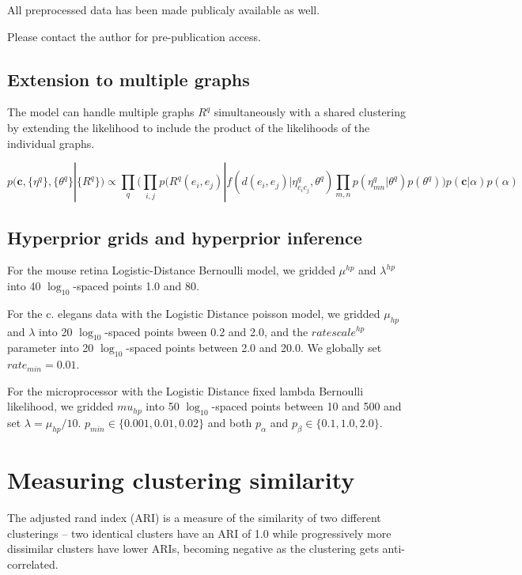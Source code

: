 \documentclass{article}
\renewcommand{\vec}[1]{\mathbf{#1}}
\begin{document}
All preprocessed data has been made publicaly available as well. 

Please contact the author for pre-publication access. 

\subsection{Extension to multiple graphs}
\label{supp:multigraph}
The model can handle multiple graphs $R^q$ simultaneously with a shared clustering by extending the likelihood to include the product of the likelihoods of the individual graphs. 

\begin{equation}
  p(\vec{c}, \{\eta^q\}, \{\theta^q\} | \{R^q\} ) \propto \prod_q \Bigg(\prod_{i, j} p(R^q(e_i, e_j) | f(d(e_i, e_j) | \eta^q_{c_ic_j}, \theta^q) \prod_{m, n} p(\eta^q_{mn} | \theta^q)  p(\theta^q) \Bigg) p(\vec{c} | \alpha) p(\alpha) 
\end{equation}

\FloatBarrier
\subsection{Hyperprior grids and hyperprior inference}
\label{supp:hyperpriors}

For the mouse retina Logistic-Distance Bernoulli model, we gridded
$\mu^{hp}$ and $\lambda^{hp}$ into 40 $\log_{10}$-spaced points 1.0
and 80. 

For the c. elegans data with the Logistic Distance poisson model, we
gridded $\mu_{hp}$ and $\lambda$ into 20 $\log_{10}$-spaced points
bween 0.2 and 2.0, and the $ratescale^{hp}$ parameter into 20
$\log_{10}$-spaced points between 2.0 and 20.0. We globally set
$rate_{min}=0.01$.

For the microprocessor with the Logistic Distance fixed lambda
Bernoulli likelihood, we gridded $mu_{hp}$ into 50 $\log_{10}$-spaced
points between 10 and 500 and set $\lambda=\mu_{hp}/10$. $p_{min} \in
\{0.001, 0.01, 0.02\}$ and both $p_\alpha$ and $p_\beta \in \{0.1,
1.0, 2.0\}$.

\section{Measuring clustering similarity}

The adjusted rand index (ARI) is a measure of the similarity of two
different clusterings \autocite{Hubert1985} -- two identical clusters
have an ARI of 1.0 while progressively more dissimilar clusters have
lower ARIs, becoming negative as the clustering gets anti-correlated.
\end{document}
